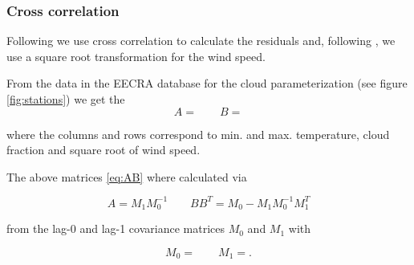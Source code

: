 \begin{refsection}
\subsubsection{Cross correlation} \label{sec:corr}
Following \cite{Richardson1981} we use cross correlation to calculate the residuals and, following \cite{ParlangeKatz2000}, we use a square root transformation for the wind speed.

From the data in the EECRA database for the cloud parameterization (see figure \ref{fig:stations}) we get the
\begin{equation}
A = 
\qquad
B =  \label{eq:AB}
\end{equation}

where the columns and rows correspond to min. and max. temperature, cloud fraction and square root of wind speed.

The above matrices \eqref{eq:AB} where calculated via

\begin{equation}
A = M_1M_0^{-1} \qquad BB^T = M_0 - M_1M_0^{-1}M_1^T
\end{equation}

from the lag-0 and lag-1 covariance  matrices $M_0$ and $M_1$ with

\begin{equation}
M_0 = 
\qquad
M_1 = .
\end{equation}


\end{refsection}

